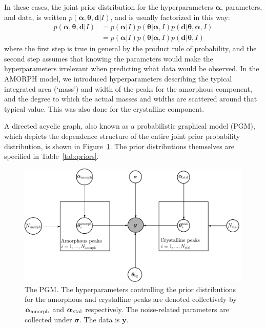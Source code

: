 \documentclass[review]{elsarticle}
\newcommand{\hypers}{\boldsymbol{\alpha}}
\newcommand{\params}{\boldsymbol{\theta}}
\newcommand{\data}{\boldsymbol{d}}
\newcommand{\info}{I}
\newcommand{\changed}{\color{blue}}
\begin{document}
{\changed In these cases,
the joint prior distribution for
the hyperparameters $\hypers$}, parameters, and data,
is written $p(\hypers, \params, \data | \info)$, and is usually factorized
in this way:
\begin{align}
p(\hypers, \params, \data | \info) &=
    p(\hypers | \info)p(\params | \hypers, \info)
    p(\data | \params, \hypers, \info)\\
    &= p(\hypers | \info)p(\params | \hypers, \info)
    p(\data | \params, \info)
\end{align}
where the first step is true in general by the product rule
{\changed of probability}, and the second
step assumes that knowing the parameters would make the hyperparameters
irrelevant when predicting what data would be observed. In the AMORPH model,
we introduced hyperparameters describing the typical {\changed integrated area (`mass')}
and width of the peaks for the amorphous component, and
the degree to which the actual {\changed masses} and widths are scattered
around that typical value. This was also done for the crystalline
component.

A directed acyclic graph, also known as a probabilistic graphical model (PGM),
which depicts the dependence structure of the entire joint
prior probability distribution,
is shown in Figure~\ref{fig:pgm-edited}. The prior distributions themselves
are specified in Table~\ref{tab:priors}.

\begin{figure}[!ht]
\centering
\includegraphics[scale=0.7]{figures/pgm-edited.pdf}
\caption{The PGM. The hyperparameters controlling the prior distributions
for the amorphous and crystalline peaks are denoted collectively
by $\boldsymbol{\alpha}_{\rm amorph}$ and
$\boldsymbol{\alpha}_{\rm xtal}$ respectively.
The noise-related parameters are collected under $\boldsymbol{\sigma}$.
The data is $\boldsymbol{y}$.\label{fig:pgm-edited}}
\end{figure}
\end{document}
